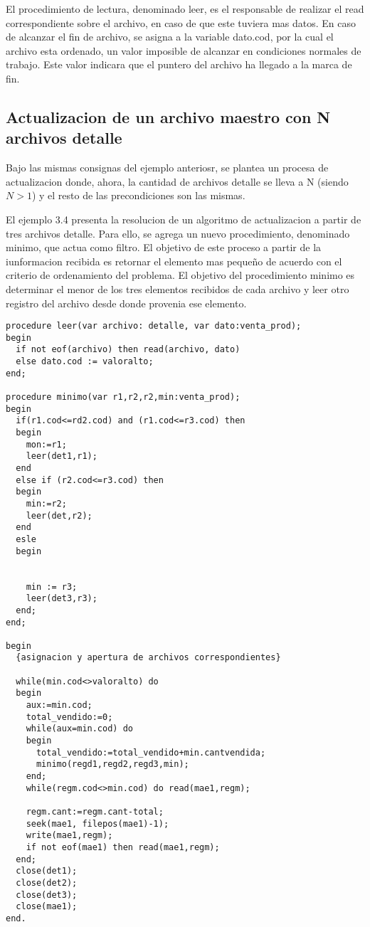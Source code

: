 El procedimiento de lectura, denominado leer, es el responsable de realizar el read correspondiente sobre el archivo, en caso de que este tuviera mas datos. En caso de alcanzar el fin de archivo, se asigna a la variable dato.cod, por la cual el archivo esta ordenado, un valor imposible de alcanzar en condiciones normales de trabajo. Este valor indicara que el puntero del archivo ha llegado a la marca de fin.

\subsection{Actualizacion de un archivo maestro con N archivos detalle}

Bajo las mismas consignas del ejemplo anteriosr, se plantea un procesa de actualizacion donde, ahora, la cantidad de archivos detalle se lleva a N (siendo $N>1$) y el resto de las precondiciones son las mismas.

El ejemplo 3.4 presenta la resolucion de un algoritmo de actualizacion a partir de tres archivos detalle. Para ello, se agrega un nuevo procedimiento, denominado minimo, que actua como filtro. El objetivo de este proceso a partir de la iunformacion recibida es retornar el elemento mas pequeño de acuerdo con el criterio de ordenamiento del problema. El objetivo del procedimiento minimo es determinar el menor de los tres elementos recibidos de cada archivo y leer otro registro del archivo desde donde provenia ese elemento.

\begin{lstlisting}
procedure leer(var archivo: detalle, var dato:venta_prod);
begin
  if not eof(archivo) then read(archivo, dato)
  else dato.cod := valoralto;
end;

procedure minimo(var r1,r2,r2,min:venta_prod);
begin
  if(r1.cod<=rd2.cod) and (r1.cod<=r3.cod) then
  begin
    mon:=r1;
    leer(det1,r1);
  end
  else if (r2.cod<=r3.cod) then
  begin
    min:=r2;
    leer(det,r2);
  end
  esle
  begin


    min := r3;
    leer(det3,r3);
  end;
end;

begin
  {asignacion y apertura de archivos correspondientes}

  while(min.cod<>valoralto) do
  begin
    aux:=min.cod;
    total_vendido:=0;
    while(aux=min.cod) do
    begin
      total_vendido:=total_vendido+min.cantvendida;
      minimo(regd1,regd2,regd3,min);
    end;
    while(regm.cod<>min.cod) do read(mae1,regm);

    regm.cant:=regm.cant-total;
    seek(mae1, filepos(mae1)-1);
    write(mae1,regm);
    if not eof(mae1) then read(mae1,regm);
  end;
  close(det1);
  close(det2);
  close(det3);
  close(mae1);
end.
\end{lstlisting}

